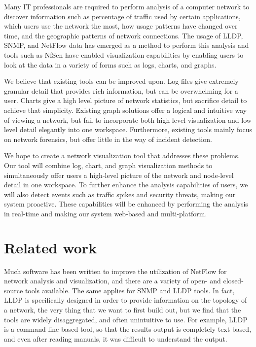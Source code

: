 \documentclass{sig-alternate}
\begin{document}
Many IT professionals are required to perform analysis of a computer network to
discover information such as percentage of traffic used by certain applications,
which users use the network the most, how usage patterns have changed over time,
and the geographic patterns of network connections. The usage of LLDP, SNMP, and
NetFlow data has emerged as a method to perform this analysis and tools such as
NfSen have enabled visualization capabilities by enabling users to look at the
data in a variety of forms such as logs, charts, and graphs.

We believe that existing tools can be improved upon. Log files give extremely
granular detail that provides rich information, but can be overwhelming for a
user. Charts give a high level picture of network statistics, but sacrifice
detail to achieve that simplicity. Existing graph solutions offer a logical and
intuitive way of viewing a network, but fail to incorporate both high level
visualization and low level detail elegantly into one workspace. Furthermore,
existing tools mainly focus on network forensics, but offer little in the way of
incident detection.

We hope to create a network visualization tool that addresses these problems.
Our tool will combine log, chart, and graph visualization methods to
simultaneously offer users a high-level picture of the network and node-level
detail in one workspace. To further enhance the analysis capabilities of users,
we will also detect events such as traffic spikes and security threats, making
our system proactive. These capabilities will be enhanced by performing the
analysis in real-time and making our system web-based and multi-platform.

\section{Related work}

Much software has been written to improve the utilization of NetFlow for network
analysis and visualization, and there are a variety of open- and closed-source
tools available. The same applies for SNMP and LLDP tools. In fact, LLDP is
specifically designed in order to provide information on the topology of a
network, the very thing that we want to first build out, but we find that the
tools are widely disaggregated, and often unintuitive to use. For example, LLDP
is a command line based tool, so that the results output is completely
text-based, and even after reading manuals, it was difficult to understand the
output.
\end{document}
